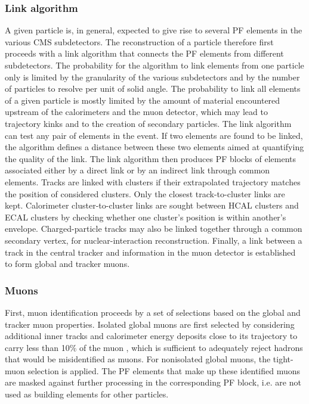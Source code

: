 \subsubsection{Link algorithm}
A given particle is, in general, expected to give rise to several PF elements in the various CMS subdetectors. The reconstruction of a particle therefore first proceeds with a link algorithm that connects the PF elements from different subdetectors. The probability for the algorithm to link elements from one particle only is limited by the granularity of the various subdetectors and by the number of particles to resolve per unit of solid angle. The probability to link all elements of a given particle is mostly limited by the amount of material encountered upstream of the calorimeters and the muon detector, which may lead to trajectory kinks and to the creation of secondary particles. The link algorithm can test any pair of elements in the event. If two elements are found to be linked, the algorithm defines a distance between these two elements aimed at quantifying the quality of the link. The link algorithm then produces PF blocks of elements associated either by a direct link or by an indirect link through common elements. Tracks are linked with clusters if their extrapolated trajectory matches the position of considered clusters. Only the closest track-to-cluster links are kept. Calorimeter cluster-to-cluster links are sought between HCAL clusters and ECAL clusters by checking whether one cluster's position is within another's envelope. Charged-particle tracks may also be linked together through a common secondary vertex, for nuclear-interaction reconstruction. Finally, a link between a track in the central tracker and information in the muon detector is established to form global and tracker muons.

\subsubsection{Muons} First, muon identification proceeds by a set of selections based on the global and tracker muon properties. Isolated global muons are first selected by considering additional inner tracks and calorimeter energy deposits close to its trajectory to carry less than 10$\%$ of the muon \pt, which is sufficient to adequately reject hadrons that would be misidentified as muons. For nonisolated global muons, the tight-muon selection \cite{collaboration_2012} is applied. The PF elements that make up these identified muons are masked against further processing in the corresponding PF block, i.e. are not used as building elements for other particles.

